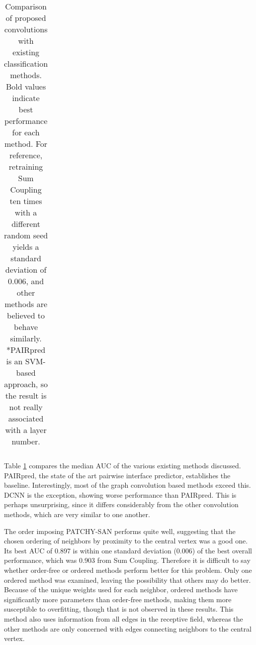 \begin{table}
\begin{center}
\begin{tabular}{l c c c c c }
			\bottomrule
			
		\end{tabular}
		\caption{Comparison of proposed convolutions with existing classification methods. Bold values indicate best performance for each method. For reference, retraining Sum Coupling ten times with a different random seed yields a standard deviation of 0.006, and other methods are believed to behave similarly. *PAIRpred is an SVM-based approach, so the result is not really associated with a layer number.}
		\label{tab:results_compare}
	\end{center}
\end{table}

Table \ref{tab:results_compare} compares the median AUC of the various existing methods discussed.
PAIRpred, the state of the art pairwise interface predictor, establishes the baseline.
Interestingly, most of the graph convolution based methods exceed this.
DCNN is the exception, showing worse performance than PAIRpred.
This is perhaps unsurprising, since it differs considerably from the other convolution methods, which are very similar to one another.

The order imposing PATCHY-SAN performs quite well, suggesting that the chosen ordering of neighbors by proximity to the central vertex was a good one.
Its best AUC of 0.897 is within one standard deviation (0.006) of the best overall performance, which was 0.903 from Sum Coupling.
Therefore it is difficult to say whether order-free or ordered methods perform better for this problem.
Only one ordered method was examined, leaving the possibility that others may do better.
Because of the unique weights used for each neighbor, ordered methods have significantly more parameters than order-free methods, making them more susceptible to overfitting, though that is not observed in these results.
This method also uses information from all edges in the receptive field, whereas the other methods are only concerned with edges connecting neighbors to the central vertex.

